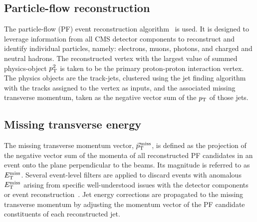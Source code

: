 \subsection{Particle-flow reconstruction}
The particle-flow (PF) event reconstruction algorithm~\cite{CMS-PRF-14-001} is used.
It is designed to leverage information from all CMS detector components to reconstruct
and identify individual particles, namely: electrons, muons, photons, and charged and neutral hadrons.
The reconstructed vertex with the largest value of summed physics-object $p_\mathrm{T}^2$ is taken to be the primary proton-proton interaction vertex.
The physics objects are the track-jets, clustered using the jet finding algorithm~\cite{Cacciari:2008gp,Cacciari:2011ma} with the 
tracks assigned to the vertex as inputs, and the associated missing transverse momentum, taken as the negative vector sum of the $p_\mathrm{T}$ of those jets.

\subsection{Missing transverse energy}
The missing transverse momentum vector, ${\vec p}_{\mathrm{T}}^{\kern1pt\textrm{miss}}$, is defined as the projection
of the negative vector sum of the momenta of all reconstructed PF candidates in an event
onto the plane perpendicular to the beams.
Its magnitude is referred to as $E_\mathrm{T}^{\mathrm{miss}}$.  Several event-level filters are applied
to discard events with anomalous $E_\mathrm{T}^{\mathrm{miss}}$ arising from specific well-understood issues 
with the detector components or event reconstruction~\cite{CMS-PAS-JME-16-004}.
Jet energy corrections are propagated to the missing transverse momentum by
adjusting the momentum vector of the PF candidate constituents of each reconstructed jet.

